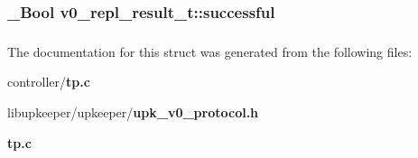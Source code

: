 \subsubsection[{successful}]{\setlength{\rightskip}{0pt plus 5cm}\_\-Bool {\bf v0\_\-repl\_\-result\_\-t::successful}}\label{structv0__repl__result__t_a910505d9dfd44b9496b32c425b3bc639}
\subsubsection[{UPK\_\-V0\_\-REPL\_\-RESULT\_\-T\_\-FIELDS}]{}\label{structv0__repl__result__t_a56b630ba015c389ca8c808cfabf68249}


The documentation for this struct was generated from the following files:\begin{DoxyCompactItemize}
\item 
controller/{\bf tp.c}\item 
libupkeeper/upkeeper/{\bf upk\_\-v0\_\-protocol.h}\item 
{\bf tp.c}\end{DoxyCompactItemize}
